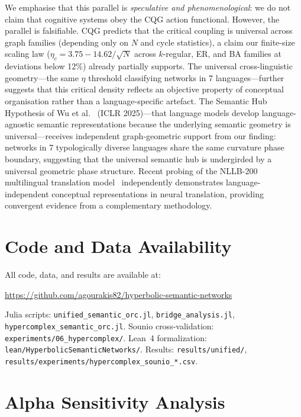 \documentclass[11pt,a4paper]{article}
\newcommand{\etac}{\eta_c}
\begin{document}
We emphasise that this parallel is \emph{speculative and phenomenological}: we do not claim that cognitive systems obey the CQG action functional. However, the parallel is falsifiable. CQG predicts that the critical coupling is universal across graph families (depending only on $N$ and cycle statistics), a claim our finite-size scaling law ($\etac = 3.75 - 14.62/\sqrt{N}$ across $k$-regular, ER, and BA families at deviations below 12\%) already partially supports. The universal cross-linguistic geometry---the same $\eta$ threshold classifying networks in 7 languages---further suggests that this critical density reflects an objective property of conceptual organisation rather than a language-specific artefact. The Semantic Hub Hypothesis of Wu et al.~\cite{wu2025semantic} (ICLR 2025)---that language models develop language-agnostic semantic representations because the underlying semantic geometry is universal---receives independent graph-geometric support from our finding: networks in 7 typologically diverse languages share the same curvature phase boundary, suggesting that the universal semantic hub is undergirded by a universal geometric phase structure. Recent probing of the NLLB-200 multilingual translation model~\cite{nllb2025universal} independently demonstrates language-independent conceptual representations in neural translation, providing convergent evidence from a complementary methodology.

\section{Code and Data Availability}

All code, data, and results are available at:

\smallskip
\noindent\url{https://github.com/agourakis82/hyperbolic-semantic-networks}
\smallskip

\noindent Julia scripts: \texttt{unified\_semantic\_orc.jl}, \texttt{bridge\_analysis.jl}, \texttt{hypercomplex\_semantic\_orc.jl}. Sounio cross-validation: \texttt{experiments/06\_hypercomplex/}. Lean~4 formalization: \texttt{lean/HyperbolicSemanticNetworks/}. Results: \texttt{results/unified/}, \texttt{results/experiments/hypercomplex\_sounio\_*.csv}.


\appendix

\section{Alpha Sensitivity Analysis}
\label{sec:alpha_sensitivity}
\end{document}
